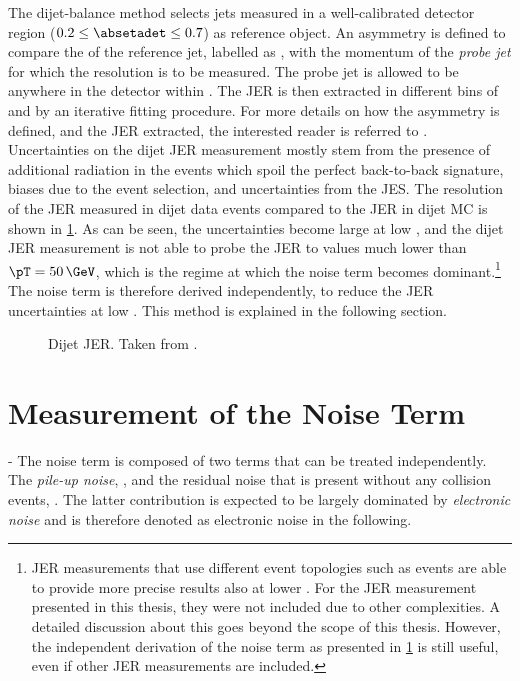 The dijet-balance method selects jets measured in a well-calibrated detector region ($0.2 \leq \absetadet \leq 0.7$) as reference object. An asymmetry is defined to compare the \pT of the reference jet, labelled as \pTref, with the momentum of the \emph{probe jet} for which the resolution is to be measured. The probe jet is allowed to be anywhere in the detector within .
The JER is then extracted in different bins of \pTref and \etadet by an iterative fitting procedure. For more details on how the asymmetry is defined, and the JER extracted, the interested reader is referred to . Uncertainties on the dijet JER measurement mostly stem from the presence of additional radiation in the events which spoil the perfect back-to-back signature, biases due to the event selection, and uncertainties from the JES. 
The resolution of the JER measured in dijet data events compared to the JER in dijet MC is shown in \cref{fig:insitu-jer-dijet-only}.
As can be seen, the uncertainties become large at low \pT, and the dijet JER measurement is not able to probe the JER to values much lower than $\pT = 50\,\GeV$, which is the regime at which the noise term becomes dominant.\footnote{JER measurements that use different event topologies such as \Zjets events are able to provide more precise results also at lower \pT. For the JER measurement presented in this thesis, they were not included due to other complexities. A detailed discussion about this goes beyond the scope of this thesis. However, the independent derivation of the noise term as presented in \cref{sec:noise-term-meas} is still useful, even if other JER measurements are included.}
The noise term is therefore derived independently, to reduce the JER uncertainties at low \pT. This method is explained in the following section.

\FloatBarrier
\begin{figure}
    \caption{Dijet JER. Taken from .}
    \label{fig:insitu-jer-dijet-only}
\end{figure}


\section{Measurement of the Noise Term}
\label{sec:noise-term-meas}
- The noise term is composed of two terms that can be treated independently. The \emph{pile-up noise}, \Npileup, and the residual noise that is present without any collision events, \Nmuzero. The latter contribution is expected to be largely dominated by \emph{electronic noise} and is therefore denoted as electronic noise in the following.

